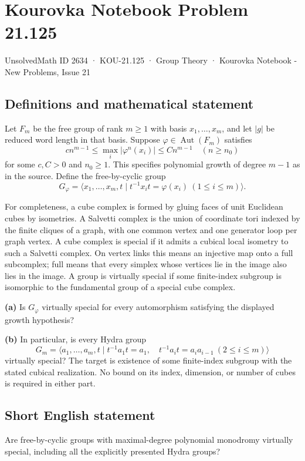 \documentclass[11pt,a4paper]{article}
\begin{document}
\section*{Kourovka Notebook Problem 21.125}\label{2634}
{\small UnsolvedMath ID 2634 · KOU-21.125 · Group Theory · Kourovka Notebook - New Problems, Issue 21}
\subsection{Definitions and mathematical statement}
Let $F_m$ be the free group of rank $m\ge1$ with basis $x_1,\ldots,x_m$, and let $|g|$ be reduced word length in that basis. Suppose $\varphi\in\operatorname{Aut}(F_m)$ satisfies
\[
 c n^{m-1}\le\max_i|\varphi^n(x_i)|\le C n^{m-1}
 \quad(n\ge n_0)
\]
for some $c,C>0$ and $n_0\ge1$. This specifies polynomial growth of degree $m-1$ as in the source. Define the free-by-cyclic group
\[
 G_\varphi=\langle x_1,\ldots,x_m,t\mid
 t^{-1}x_it=\varphi(x_i)\ (1\le i\le m)\rangle.
\]

For completeness, a cube complex is formed by gluing faces of unit Euclidean cubes by isometries. A Salvetti complex is the union of coordinate tori indexed by the finite cliques of a graph, with one common vertex and one generator loop per graph vertex. A cube complex is special if it admits a cubical local isometry to such a Salvetti complex. On vertex links this means an injective map onto a full subcomplex; full means that every simplex whose vertices lie in the image also lies in the image. A group is virtually special if some finite-index subgroup is isomorphic to the fundamental group of a special cube complex.

\textbf{(a)} Is $G_\varphi$ virtually special for every automorphism satisfying the displayed growth hypothesis?

\textbf{(b)} In particular, is every Hydra group
\[
 G_m=\langle a_1,\ldots,a_m,t\mid
 t^{-1}a_1t=a_1,\quad t^{-1}a_it=a_ia_{i-1}\ (2\le i\le m)\rangle
\]
virtually special? The target is existence of some finite-index subgroup with the stated cubical realization. No bound on its index, dimension, or number of cubes is required in either part.
\subsection{Short English statement}
Are free-by-cyclic groups with maximal-degree polynomial monodromy virtually special, including all the explicitly presented Hydra groups?
\end{document}
